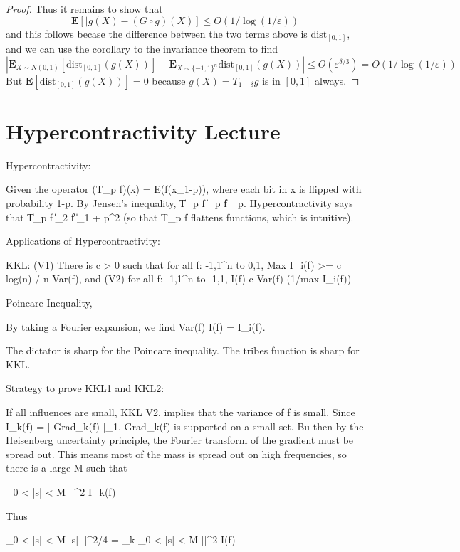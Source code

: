 \begin{proof}
    Thus it remains to show that
    \[ \mathbf{E}[|g(X) - (G \circ g)(X)] \leq O(1/\log(1/\varepsilon)) \]
    and this follows becase the difference between the two terms above is $\text{dist}_{[0,1]}$, and we can use the corollary to the invariance theorem to find
    \[ \left| \mathbf{E}_{X \sim N(0,1)}[\text{dist}_{[0,1]}(g(X))] - \mathbf{E}_{X \sim \{ -1, 1 \}^n} \text{dist}_{[0,1]}(g(X)) \right| \leq O(\varepsilon^{\delta/3}) = O(1/\log(1/\varepsilon)) \]
    But $\mathbf{E}[\text{dist}_{[0,1]}(g(X))] = 0$ because $g(X) = T_{1-\delta}g$ is in $[0,1]$ always.
\end{proof}

\chapter{Hypercontractivity Lecture}

Hypercontractivity:

Given the operator (T_p f)(x) = E(f(x_{1-p})), where each bit in x is flipped with probability 1-p. By Jensen's inequality, \| T_p f \|_p \leq \| f \_p. Hypercontractivity says that \| T_p f \|_2 \leq \| f \|_{1 + p^2} (so that T_p f flattens functions, which is intuitive).

Applications of Hypercontractivity:

KKL: (V1) There is c > 0 such that for all f: {-1,1}^n to {0,1}, Max I_i(f) >= c log(n) / n Var(f), and (V2) for all f: {-1,1}^n to {-1,1}, I(f) \geq c Var(f) \log(1/max I_i(f))

Poincare Inequality,

By taking a Fourier expansion, we find Var(f) \leq I(f) = \sum I_i(f).

The dictator is sharp for the Poincare inequality. The tribes function is sharp for KKL.

Strategy to prove KKL1 and KKL2:

If all influences are small, KKL V2. implies that the variance of f is small. Since I_k(f) = | Grad_k(f) |_1, Grad_k(f) is supported on a small set. Bu then by the Heisenberg uncertainty principle, the Fourier transform of the gradient must be spread out. This means most of the mass is spread out on high frequencies, so there is a large M such that

\sum_{0 < |s| < M} ||^2 \ll I_k(f)

Thus

\sum_{0 < |s| < M} |s| ||^2/4  = \sum_k \sum_{0 < |s| < M} ||^2 \ll I(f)

